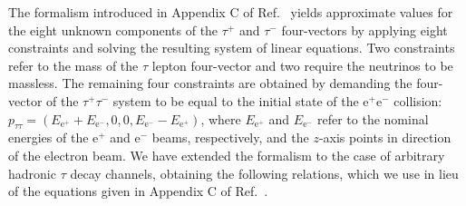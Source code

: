 \documentclass[a4paper,12pt,twocolumn]{article}
\numberwithin{equation}{section} %
\newcommand{\Pem}{\ensuremath{\textrm{e}^{-}}\xspace}
\newcommand{\Pep}{\ensuremath{\textrm{e}^{+}}\xspace}
\newcommand{\Pgt}{\ensuremath{\tau}\xspace}
\newcommand{\Pgtm}{\ensuremath{\tau^{-}}\xspace}
\newcommand{\Pgtp}{\ensuremath{\tau^{+}}\xspace}
\begin{document}
The formalism introduced in Appendix C of Ref.~\cite{Altakach:2022ywa} yields approximate values for the eight unknown components of the $\Pgtp$ and $\Pgtm$ four-vectors by applying eight constraints and solving the resulting system of linear equations. Two constraints refer to the mass of the $\Pgt$ lepton four-vector and two require the neutrinos to be massless. The remaining four constraints are obtained by demanding the four-vector of the $\Pgtp\Pgtm$ system to be equal to the initial state of the $\Pep\Pem$ collision: $p_{\Pgt\Pgt} = (E_{\Pep} + E_{\Pem}, 0, 0, E_{\Pem} - E_{\Pep})$, where $E_{\Pep}$ and $E_{\Pem}$ refer to the nominal energies of the $\Pep$ and $\Pem$ beams, respectively, and the $z$-axis points in direction of the electron beam.
We have extended the formalism to the case of arbitrary hadronic $\Pgt$ decay channels,
obtaining the following relations, which we use in lieu of the equations given in Appendix C of Ref.~\cite{Altakach:2022ywa}.
\end{document}

